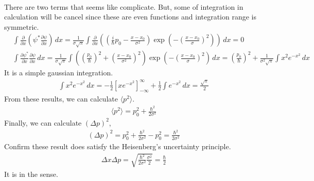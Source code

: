 \documentclass[aps,floatfix,nofootinbib,superscriptaddress,fleqn]{revtex4}
\begin{document}
\begin{itemize}
\begin{align}
\end{align}
There are two terms that seems like complicate. But, some of integration in calculation will be cancel since these are even functions and integration range is symmetric.
\begin{align}   
       &\int \frac{\partial}{\partial x}
          \left(\psi^* \frac{\partial \psi}{\partial x}
          \right) \,dx 
          = \frac{1}{\sigma\sqrt{\pi}}\int\frac{\partial}{\partial x}
            \left(
              \left(\frac{i}{\hbar}p_0-\frac{x-x_0}{\sigma^2}
              \right)\exp
                \left(-{
                  \left(\frac{x-x_0}{\sigma}
                  \right)}^2 
                \right)
              \right)\,dx = 0
   \\  &\int \frac{\partial \psi^*}{\partial x}\frac{\partial \psi}{\partial x} \,dx 
          = \frac{1}{\sigma\sqrt{\pi}}\int
            \left(
              \left(\frac{p_0}{\hbar}
                                     \right)^2
             +\left(\frac{x-x_0}{\sigma^2}
                                          \right)^2
                                                    \right)\exp
            \left(-{
              \left(\frac{x-x_0}{\sigma}
                                        \right)}^2
                                                  \right)\,dx 
          = \left(\frac{p_0}{\hbar}
                                    \right)^2+\frac{1}{\sigma^2\sqrt{\pi}}\int x^2e^{-x^2}\,dx
\end{align}
It is a simple gaussian integration.
\begin{align}
  \int x^2e^{-x^2}\,dx = -\frac{1}{2}\left[xe^{-x^2}\right]^{\infty}_{-\infty}+\frac{1}{2}\int e^{-x^2}\,dx = \frac{\sqrt{\pi}}{2}
\end{align}
From these results, we can calculate $\langle p^2 \rangle$.
\begin{align}
  \langle p^2 \rangle = p_0^2 + \frac{\hbar^2}{2\sigma^2}
\end{align}
Finally, we can calculate $\left( \Delta p \right)^2$,
\begin{align}
  \left( \Delta p \right)^2 = p_0^2 + \frac{\hbar^2}{2\sigma^2} - p_0^2 = \frac{\hbar^2}{2\sigma^2}
\end{align}
Confirm these result does satisfy the Heisenberg's uncertainty principle.
\begin{align}
  \Delta x \Delta p = \sqrt{\frac{\hbar^2}{2\sigma^2}\frac{\sigma^2}{2}} = \frac{\hbar}{2}
\end{align}
It is in the sense.
  \end{itemize}
\end{document}
